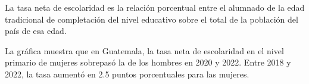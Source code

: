 La tasa neta de escolaridad es la relación porcentual entre el alumnado de la edad tradicional de completación del nivel educativo sobre el total de la población del país de esa edad.

La gráfica muestra que en Guatemala, la tasa neta de escolaridad en el nivel primario de mujeres sobrepasó la de los hombres en 2020 y 2022. Entre 2018 y 2022, la tasa aumentó en
2.5 puntos porcentuales para las mujeres.